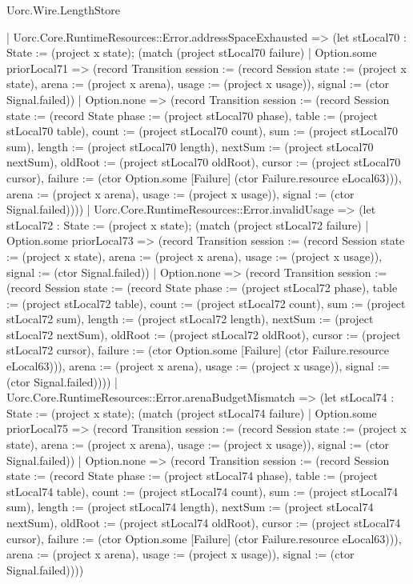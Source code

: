 \begin{lexlean}{Uorc.Wire.LengthStore}
\begin{semanticmodule}
{      | Uorc.Core.RuntimeResources::Error.addressSpaceExhausted => (let stLocal70 : State := (project x state); (match (project stLocal70 failure)
        | Option.some priorLocal71 => (record Transition {session := (record Session {state := (project x state), arena := (project x arena), usage := (project x usage)}), signal := (ctor Signal.failed)})
        | Option.none => (record Transition {session := (record Session {state := (record State {phase := (project stLocal70 phase), table := (project stLocal70 table), count := (project stLocal70 count), sum := (project stLocal70 sum), length := (project stLocal70 length), nextSum := (project stLocal70 nextSum), oldRoot := (project stLocal70 oldRoot), cursor := (project stLocal70 cursor), failure := (ctor Option.some [Failure] (ctor Failure.resource eLocal63))}), arena := (project x arena), usage := (project x usage)}), signal := (ctor Signal.failed)})))
      | Uorc.Core.RuntimeResources::Error.invalidUsage => (let stLocal72 : State := (project x state); (match (project stLocal72 failure)
        | Option.some priorLocal73 => (record Transition {session := (record Session {state := (project x state), arena := (project x arena), usage := (project x usage)}), signal := (ctor Signal.failed)})
        | Option.none => (record Transition {session := (record Session {state := (record State {phase := (project stLocal72 phase), table := (project stLocal72 table), count := (project stLocal72 count), sum := (project stLocal72 sum), length := (project stLocal72 length), nextSum := (project stLocal72 nextSum), oldRoot := (project stLocal72 oldRoot), cursor := (project stLocal72 cursor), failure := (ctor Option.some [Failure] (ctor Failure.resource eLocal63))}), arena := (project x arena), usage := (project x usage)}), signal := (ctor Signal.failed)})))
      | Uorc.Core.RuntimeResources::Error.arenaBudgetMismatch => (let stLocal74 : State := (project x state); (match (project stLocal74 failure)
        | Option.some priorLocal75 => (record Transition {session := (record Session {state := (project x state), arena := (project x arena), usage := (project x usage)}), signal := (ctor Signal.failed)})
        | Option.none => (record Transition {session := (record Session {state := (record State {phase := (project stLocal74 phase), table := (project stLocal74 table), count := (project stLocal74 count), sum := (project stLocal74 sum), length := (project stLocal74 length), nextSum := (project stLocal74 nextSum), oldRoot := (project stLocal74 oldRoot), cursor := (project stLocal74 cursor), failure := (ctor Option.some [Failure] (ctor Failure.resource eLocal63))}), arena := (project x arena), usage := (project x usage)}), signal := (ctor Signal.failed)})))
}
\end{semanticmodule}
\end{lexlean}

